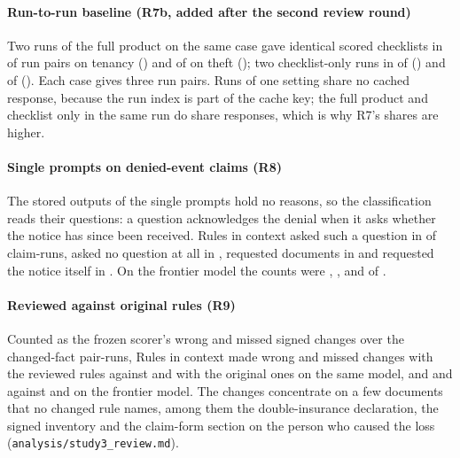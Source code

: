 \paragraph{Run-to-run baseline (R7b, added after the second review round)}
Two runs of the full product on the same case gave identical scored checklists in \sthreeRSevenBTenCasePathIdentical{} of \sthreeRSevenBTenCasePathPairs{} run pairs on tenancy (\sthreeRSevenBTenCasePathIdenticalShare) and \sthreeRSevenBThCasePathIdentical{} of \sthreeRSevenBThCasePathPairs{} on theft (\sthreeRSevenBThCasePathIdenticalShare); two checklist-only runs in \sthreeRSevenBTenChecklistIdentical{} of \sthreeRSevenBTenChecklistPairs{} (\sthreeRSevenBTenChecklistIdenticalShare) and \sthreeRSevenBThChecklistIdentical{} of \sthreeRSevenBThChecklistPairs{} (\sthreeRSevenBThChecklistIdenticalShare). Each case gives three run pairs. Runs of one setting share no cached response, because the run index is part of the cache key; the full product and checklist only in the same run do share responses, which is why R7's shares are higher.

\paragraph{Single prompts on denied-event claims (R8)}
The stored outputs of the single prompts hold no reasons, so the classification reads their questions: a question acknowledges the denial when it asks whether the notice has since been received. Rules in context asked such a question in \sthreeREightRicAck{} of \sthreeREightRicRuns{} claim-runs, asked no question at all in \sthreeREightRicNoQuestion, requested documents in \sthreeREightRicRequests{} and requested the notice itself in \sthreeREightRicRequestsNotice. On the frontier model the counts were \sthreeREightRicFrontierAck, \sthreeREightRicFrontierNoQuestion, \sthreeREightRicFrontierRequests{} and \sthreeREightRicFrontierRequestsNotice{} of \sthreeREightRicFrontierRuns.

\paragraph{Reviewed against original rules (R9)}
Counted as the frozen scorer's wrong and missed signed changes over the changed-fact pair-runs, Rules in context made \sthreeRNineLunaWrongReviewed{} wrong and \sthreeRNineLunaMissedReviewed{} missed changes with the reviewed rules against \sthreeRNineLunaWrongOriginal{} and \sthreeRNineLunaMissedOriginal{} with the original ones on the same model, and \sthreeRNineTerraWrongReviewed{} and \sthreeRNineTerraMissedReviewed{} against \sthreeRNineTerraWrongOriginal{} and \sthreeRNineTerraMissedOriginal{} on the frontier model. The changes concentrate on a few documents that no changed rule names, among them the double-insurance declaration, the signed inventory and the claim-form section on the person who caused the loss (\texttt{analysis/\allowbreak{}study3\_\allowbreak{}review.md}).

